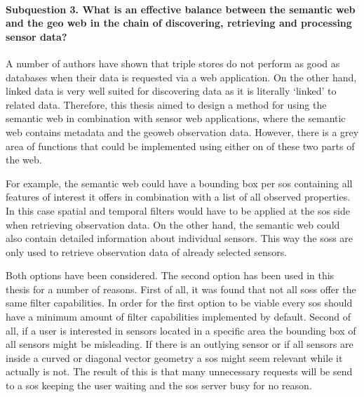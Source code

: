 
\paragraph{\textbf{Subquestion 3.} What is an effective balance between the semantic web and the geo web in the chain of discovering, retrieving and processing sensor data?}\mbox{}

A number of authors have shown that triple stores do not perform as good as databases when their data is requested via a web application. On the other hand, linked data is very well suited for discovering data as it is literally `linked' to related data. Therefore, this thesis aimed to design a method for using the semantic web in combination with sensor web applications, where the semantic web contains metadata and the geoweb observation data. However, there is a grey area of functions that could be implemented using either on of these two parts of the web. 

For example, the semantic web could have a bounding box per \ac{sos} containing all features of interest it offers in combination with a list of all observed properties. In this case spatial and temporal filters would have to be applied at the \ac{sos} side when retrieving observation data. On the other hand, the semantic web could also contain detailed information about individual sensors. This way the \aclp{sos} are only used to retrieve observation data of already selected sensors.

Both options have been considered. The second option has been used in this thesis for a number of reasons. First of all, it was found that not all \aclp{sos} offer the same filter capabilities. In order for the first option to be viable every \ac{sos} should have a minimum amount of filter capabilities implemented by default. 
Second of all, if a user is interested in sensors located in a specific area the bounding box of all sensors might be misleading. If there is an outlying sensor or if all sensors are inside a curved or diagonal vector geometry a \ac{sos} might seem relevant while it actually is not. The result of this is that many unnecessary requests will be send to a \ac{sos} keeping the user waiting and the \ac{sos} server busy for no reason. 

